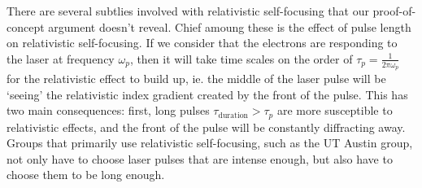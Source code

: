\documentclass[12pt,letter]{article}
\begin{document}
There are several subtlies involved with relativistic self-focusing that
our proof-of-concept argument doesn't reveal. Chief amoung these is the effect
of pulse length on relativistic self-focusing. If we consider that the electrons
are responding to the laser at frequency $\omega_p$, then it will take time scales on the order of $\tau_p
= \frac{1}{2\pi\omega_p}$ for the relativistic effect to build up, ie. the middle
    of the laser pulse will be `seeing' the relativistic index gradient created
    by the front of the pulse. This has two main consequences: first, long
    pulses $\tau_\textrm{duration} > \tau_p$ are more susceptible to
    relativistic effects, and the front of the pulse will be constantly
    diffracting away. Groups that primarily use relativistic self-focusing, such
    as the UT Austin group, not
    only have to choose laser pulses that are intense enough, but also have to
    choose them to be long enough. 
\end{document}
